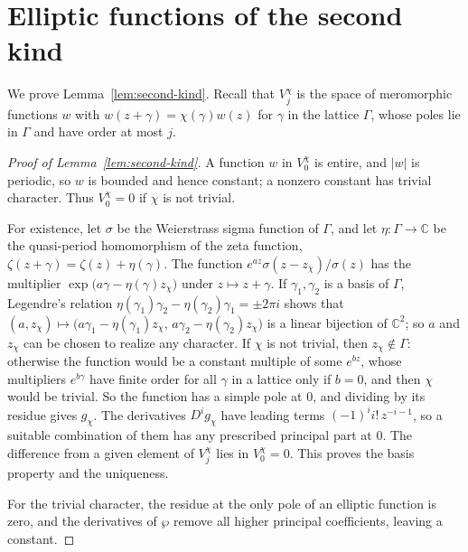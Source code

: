 \documentclass[11pt]{article}
\theoremstyle{definition}
\theoremstyle{remark}
\numberwithin{equation}{section}
\newcommand{\CC}{\mathbb C}
\begin{document}
\section{Elliptic functions of the second kind}\label{app:deferred}\label{app:second-kind}

We prove Lemma~\ref{lem:second-kind}. Recall that \(V_j^\chi\) is the
space of meromorphic functions \(w\) with
\(w(z+\gamma)=\chi(\gamma)w(z)\) for \(\gamma\) in the lattice
\(\Gamma\), whose poles lie in \(\Gamma\) and have order at most \(j\).

\begin{proof}[Proof of Lemma~\ref{lem:second-kind}]
A function \(w\) in \(V_0^\chi\) is entire, and \(|w|\) is periodic, so
\(w\) is bounded and hence constant; a nonzero constant has trivial
character. Thus \(V_0^\chi=0\) if \(\chi\) is not trivial.

For existence, let \(\sigma\) be the Weierstrass sigma function of
\(\Gamma\), and let \(\eta\colon\Gamma\to\CC\) be the quasi-period
homomorphism of the zeta function, \(\zeta(z+\gamma)=\zeta(z)+\eta(\gamma)\).
The function \(e^{az}\sigma(z-z_\chi)/\sigma(z)\) has the multiplier
\(\exp\bigl(a\gamma-\eta(\gamma)z_\chi\bigr)\) under \(z\mapsto z+\gamma\).
If \(\gamma_1,\gamma_2\) is a basis of \(\Gamma\), Legendre's relation
\(\eta(\gamma_1)\gamma_2-\eta(\gamma_2)\gamma_1=\pm2\pi i\) shows that
\((a,z_\chi)\mapsto\bigl(a\gamma_1-\eta(\gamma_1)z_\chi,\,a\gamma_2-\eta(\gamma_2)z_\chi\bigr)\)
is a linear bijection of \(\CC^2\); so \(a\) and \(z_\chi\) can be chosen
to realize any character. If \(\chi\) is not trivial, then
\(z_\chi\notin\Gamma\): otherwise the function would be a constant
multiple of some \(e^{bz}\), whose multipliers \(e^{b\gamma}\) have
finite order for all \(\gamma\) in a lattice only if \(b=0\), and then
\(\chi\) would be trivial. So the function has a simple pole at \(0\),
and dividing by its residue gives \(g_\chi\). The derivatives
\(D^ig_\chi\) have leading terms \((-1)^ii!\,z^{-i-1}\), so a suitable
combination of them has any prescribed principal part at \(0\). The
difference from a given element of \(V_j^\chi\) lies in \(V_0^\chi=0\).
This proves the basis property and the uniqueness.

For the trivial character, the residue at the only pole of an elliptic
function is zero, and the derivatives of \(\wp\) remove all higher
principal coefficients, leaving a constant.
\end{proof}
\end{document}
